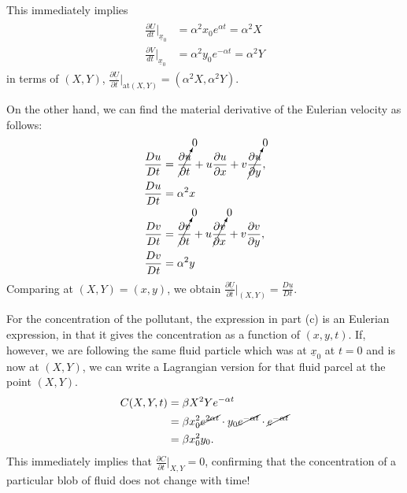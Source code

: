 \documentclass{article}
\begin{document}
This immediately implies
\begin{align}\label{eq:lagrangian_acc}
 \begin{split}
  \frac{\partial U}{dt}\bigg|_{\underline{x}_{0}} & = \alpha^{2} x_{0} e^{\alpha t} = \alpha^{2}X \\
  \frac{\partial V}{dt}\bigg|_{\underline{x}_{0}} &= \alpha^{2} y_{0} e^{-\alpha t} = \alpha^{2}Y
 \end{split}
\end{align}
in terms of $(X, Y)$, 
$\boxed{\frac{\partial \underline{U}}{\partial t} \bigg|_{\textrm{at} (X, Y)} = (\alpha^{2}X, \alpha^{2}Y)}$.

On the other hand, we can find the material derivative of the Eulerian velocity as follows:
\begin{align}\label{eq:eulerian_acc}
 \begin{split}
   \frac{Du}{Dt} &= \cancelto{0}{\frac{\partial u}{\partial t}} + u\frac{\partial u}{\partial x} + v \cancelto{0}{\frac{\partial u}{\partial y}},\\
   \frac{Du}{Dt} & = \alpha^{2}x \\
   \frac{Dv}{Dt} &= \cancelto{0}{\frac{\partial v}{\partial t}} + u \cancelto{0}{\frac{\partial v}{\partial x}} + v\frac{\partial v}{\partial y} ,\\
   \frac{Dv}{Dt} & = \alpha^{2}y \\
 \end{split}
\end{align}
Comparing at $(X,Y) = (x, y)$, we obtain $\boxed{\frac{\partial \underline{U}}{\partial t} \big|_{(X, Y)} = \frac{D\underline{u}}{Dt}}$.

For the concentration of the pollutant, the expression in part (c) is an Eulerian expression, in that it gives the concentration as a function of $(x, y, t)$. If, however, we are following the same fluid particle which was at $\underline{x}_{0}$ at $t = 0$ and is now at $(X, Y)$, we can write a Lagrangian version for that fluid parcel at the point $(X, Y)$.
\begin{align}\label{eq:lagrangian_conc}
 \begin{split}
  C(X, Y, t) &= \beta X^{2}Ye^{-\alpha t}\\
  &= \beta x_{0}^{2} \cancel{e^{2\alpha t}}\cdot y_{0} \cancel{e^{-\alpha t}} \cdot \cancel{e^{-\alpha t}}\\
  &= \beta x_{0}^{2}y_{0}.
 \end{split}
\end{align}
This immediately implies that $\frac{\partial C}{\partial t}\big|_{X, Y} = 0$, confirming that the concentration of a particular blob of fluid does not change with time!
\end{document}
